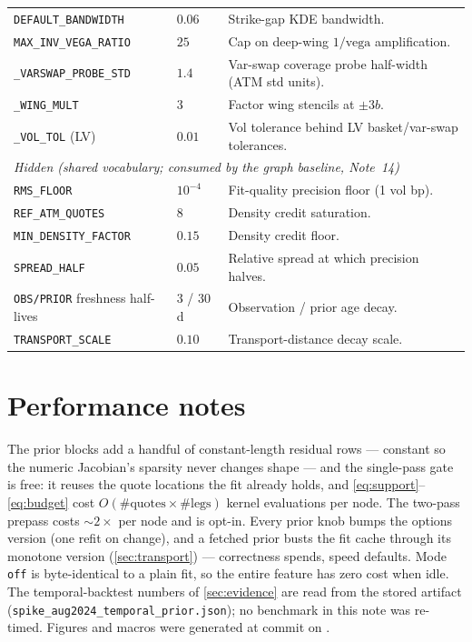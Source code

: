 \documentclass[11pt]{article}
\begin{document}
\begin{longtable}{p{}p{}p{}}
\texttt{DEFAULT\_BANDWIDTH} & $0.06$ & Strike-gap KDE bandwidth.\\
\texttt{MAX\_INV\_VEGA\_RATIO} & $25$ & Cap on deep-wing
$1/\text{vega}$ amplification.\\
\texttt{\_VARSWAP\_PROBE\_STD} & $1.4$ & Var-swap coverage probe
half-width (ATM std units).\\
\texttt{\_WING\_MULT} & $3$ & Factor wing stencils at $\pm3b$.\\
\texttt{\_VOL\_TOL} (LV) & $0.01$ & Vol tolerance behind LV
basket/var-swap tolerances.\\
\midrule
\multicolumn{3}{l}{\emph{Hidden (shared vocabulary; consumed by the
graph baseline, Note~14)}}\\ \midrule
\texttt{RMS\_FLOOR} & $10^{-4}$ & Fit-quality precision floor (1 vol
bp).\\
\texttt{REF\_ATM\_QUOTES} & $8$ & Density credit saturation.\\
\texttt{MIN\_DENSITY\_FACTOR} & $0.15$ & Density credit floor.\\
\texttt{SPREAD\_HALF} & $0.05$ & Relative spread at which precision
halves.\\
\texttt{OBS/PRIOR} freshness half-lives & $3$ / $30$ d & Observation /
prior age decay.\\
\texttt{TRANSPORT\_SCALE} & $0.10$ & Transport-distance decay
scale.\\
\bottomrule
\end{longtable}
\normalsize

\section{Performance notes}
\label{app:perf}

The prior blocks add a handful of constant-length residual rows ---
constant so the numeric Jacobian's sparsity never changes shape ---
and the single-pass gate is free: it reuses the quote locations the
fit already holds, and \eqref{eq:support}--\eqref{eq:budget} cost
$O(\#\text{quotes}\times\#\text{legs})$ kernel evaluations per node.
The two-pass prepass costs ${\sim}2\times$ per node and is opt-in.
Every prior knob bumps the options version (one refit on change), and
a fetched prior busts the fit cache through its monotone version
(\cref{sec:transport}) --- correctness spends, speed defaults.  Mode
\texttt{off} is byte-identical to a plain fit, so the entire feature
has zero cost when idle.  The temporal-backtest numbers of
\cref{sec:evidence} are read from the stored artifact
(\texttt{spike\_aug2024\_temporal\_prior.json}); no benchmark in this
note was re-timed.  Figures and macros were generated at commit
\texttt{\pflgencommit} on \pflgendate.
\end{document}
